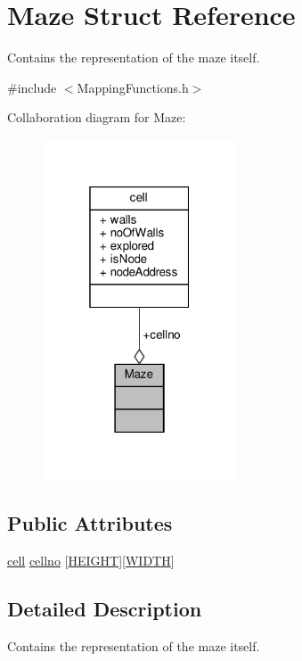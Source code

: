 \hypertarget{structMaze}{}\section{Maze Struct Reference}
\label{structMaze}


Contains the representation of the maze itself.  




{\ttfamily \#include $<$Mapping\+Functions.\+h$>$}



Collaboration diagram for Maze\+:
\nopagebreak
\begin{figure}[H]
\begin{center}
\leavevmode
\includegraphics[width=163pt]{structMaze__coll__graph}
\end{center}
\end{figure}
\subsection*{Public Attributes}
\begin{DoxyCompactItemize}
\item 
\hyperlink{structcell}{cell} \hyperlink{structMaze_ae37dc660fb366743f092d44446bc3733}{cellno} \mbox{[}\hyperlink{MappingFunctions_8h_aed89bd71aee8be823e8a20ec4e093c1e}{H\+E\+I\+G\+HT}\mbox{]}\mbox{[}\hyperlink{MappingFunctions_8h_a241aeeb764887ae5e3de58b98f04b16d}{W\+I\+D\+TH}\mbox{]}
\end{DoxyCompactItemize}


\subsection{Detailed Description}
Contains the representation of the maze itself. 

